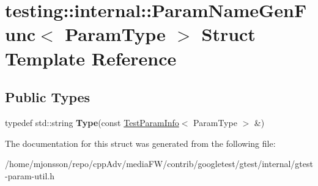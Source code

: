 \hypertarget{structtesting_1_1internal_1_1ParamNameGenFunc}{}\section{testing\+:\+:internal\+:\+:Param\+Name\+Gen\+Func$<$ Param\+Type $>$ Struct Template Reference}
\label{structtesting_1_1internal_1_1ParamNameGenFunc}
\subsection*{Public Types}
\begin{DoxyCompactItemize}
\item 
\mbox{\label{structtesting_1_1internal_1_1ParamNameGenFunc_adf1ce5df22a930ae715082862d72590f}} 
typedef std\+::string {\bfseries Type}(const \hyperlink{structtesting_1_1TestParamInfo}{Test\+Param\+Info}$<$ Param\+Type $>$ \&)
\end{DoxyCompactItemize}


The documentation for this struct was generated from the following file\+:\begin{DoxyCompactItemize}
\item 
/home/mjonsson/repo/cpp\+Adv/media\+F\+W/contrib/googletest/gtest/internal/gtest-\/param-\/util.\+h\end{DoxyCompactItemize}
